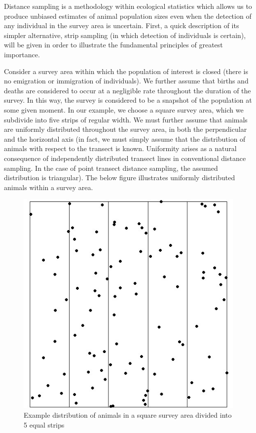 \documentclass[11pt]{article}
\begin{document}
\begin{multicols}{2}
Distance sampling is a methodology within ecological statistics which allows us to produce unbiased estimates of animal population sizes even when the detection of any individual in the survey area is uncertain. First, a quick description of its simpler alternative, strip sampling (in which detection of individuals is certain), will be given in order to illustrate the fundamental principles of greatest importance. 

Consider a survey area within which the population of interest is closed (there is no emigration or immigration of individuals). We further assume that births and deaths are considered to occur at a negligible rate throughout the duration of the survey. In this way, the survey is considered to be a snapshot of the population at some given moment. In our example, we choose a square survey area, which we subdivide into five strips of regular width. We must further assume that animals are uniformly distributed throughout the survey area, in both the perpendicular and the horizontal axis (in fact, we must simply assume that the distribution of animals with respect to the transect is known. Uniformity arises as a natural consequence of independently distributed transect lines in conventional distance sampling. In the case of point transect distance sampling, the assumed distribution is triangular). The below figure illustrates uniformly distributed animals within a survey area.

\begin{figure}[H]
\centering
\includegraphics[scale=0.5]{StripSampling}
\caption{Example distribution of animals in a square survey area divided into 5 equal strips}
\end{figure}


\end{multicols}
\end{document}
